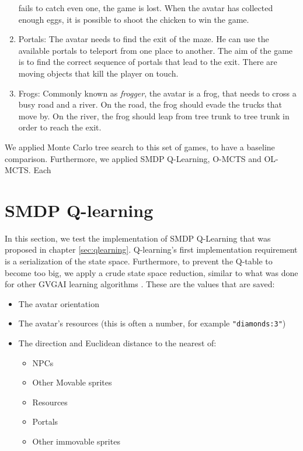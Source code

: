 \begin{enumerate}
		fails to catch even one, the game is lost. When the avatar
		has collected enough eggs, it is possible to shoot the chicken to win
		the game.
	\item Portals:
		The avatar needs to find the exit of the maze. He can use the available
		portals to teleport from one place to another. The aim of the game is to
		find the correct sequence of portals that lead to the exit. There are
		moving objects that kill the player on touch.
	\item Frogs:
		Commonly known as \textit{frogger}, the avatar is a frog, that needs to
		cross a busy road and a river. On the road, the frog should evade the
		trucks that move by. On the river, the frog should leap from tree trunk
		to tree trunk in order to reach the exit.
\end{enumerate}

We applied Monte Carlo tree search to this set of games, to have a baseline
comparison. Furthermore, we applied SMDP Q-Learning, O-MCTS and OL-MCTS. Each 

\section{SMDP Q-learning}
In this section, we test the implementation of SMDP Q-Learning that was proposed
in chapter \ref{sec:qlearning}. Q-learning's first implementation requirement is
a serialization of the state space.  Furthermore, to prevent the Q-table to
become too big, we apply a crude state space reduction, similar to what was done
for other GVGAI learning algorithms \cite{samothrakis2015neuroevolution}.  These
are the values that are saved:

\begin{itemize}
	\item The avatar orientation
	\item The avatar's resources (this is often a number, for example
		\texttt{"diamonds:3"})
	\item The direction and Euclidean distance to the nearest of:
		\begin{itemize}
			\item NPCs
			\item Other Movable sprites
			\item Resources
			\item Portals
			\item Other immovable sprites
		\end{itemize}
\end{itemize}

